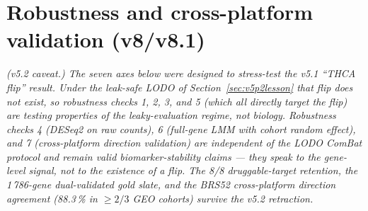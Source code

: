 \documentclass[11pt,a4paper]{article}
\begin{document}
\section{Robustness and cross-platform validation (v8/v8.1)}
\label{sec:robustness}
\emph{(v5.2 caveat.) The seven axes below were designed to stress-test
the v5.1 ``THCA flip'' result. Under the leak-safe LODO of
Section~\ref{sec:v5p2lesson} that flip does not exist, so robustness
checks 1, 2, 3, and 5 (which all directly target the flip) are
testing properties of the leaky-evaluation regime, not biology.
Robustness checks 4 (DESeq2 on raw counts), 6 (full-gene LMM with
cohort random effect), and 7 (cross-platform direction validation) are
\emph{independent of} the LODO ComBat protocol and remain valid
biomarker-stability claims --- they speak to the gene-level signal,
not to the existence of a flip. The 8/8 druggable-target retention,
the 1\,786-gene dual-validated gold slate, and the BRS52 cross-platform
direction agreement (88.3\,\% in $\ge 2/3$ GEO cohorts) survive the
v5.2 retraction.}
\end{document}
